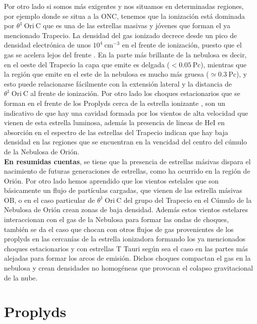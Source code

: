 Por otro lado si somos más exigentes y nos situamos en determinadas regiones, por ejemplo donde se situa a la ONC, tenemos que la ionización está dominada por  \(\theta^1\ \text{Ori}\ \text{C}\) que es una de las estrellas masivas y jóvenes que forman el ya mencionado Trapecio. La densidad del gas ionizado decrece desde un pico de densidad electrónica de unos  \(10^{4}~\text{cm}^{-3}\) en el frente de ionización, puesto que el gas se acelera lejos del frente \citep{Henney:2005a}. En la parte más brillante de la nebulosa es decir, en el oeste del Trapecio la capa que emite es delgada (\(< 0.05 ~\text{Pc}\)), mientras que la región que emite en el este de la nebulosa es mucho más gruesa (\(\simeq 0.3~\text{Pc}\)), y esto puede relacionarse fácilmente con la extensión lateral y la distancia de  \(\theta^1\ \text{Ori}\ \text{C}\) al frente de ionización. Por otro lado los choques estacionarios que se forman en el frente de los Proplyds cerca de la estrella ionizante \citep{Bally:2000a}, son un indicativo de que hay una cavidad formada por los vientos de alta velocidad que vienen de esta estrella luminosa, además  la presencia de lineas de HeI en absorción en el espectro de las estrellas del Trapecio \citep{ Odell:1993, Baldwin:1991} indican que hay baja densidad en las regiones que se encuentran en la vencidad del centro del cúmulo de la Nebulosa de Orión. \\

\textbf{En resumidas cuentas}, se tiene que la presencia de estrellas másivas dispara el nacimiento de futuras generaciones de estrellas, como ha ocurrido en la región de Orión. Por otro lado hemos aprendido que los vientos estelales que son básicamente un flujo de partículas cargadas, que vienen de las estrella másivas OB, o en el caso particular de \(\theta^1\ \text{Ori}\ \text{C}\) del grupo del Trapecio en el Cúmulo de la Nebulosa de Orión crean zonas de baja densidad. Además estos vientos estelares interaccionan con el gas de la Nebulosa para formar las ondas de choques, también se da el caso que chocan con otros flujos de gas provenientes de los proplyds en las cercanías de la estrella ionizadora formando los ya mencionados choques estacionarios y con estrellas T Tauri según sea el caso en las partes más alejadas para formar los arcos de emisión. Dichos choques compactan el gas en la nebulosa y crean densidades no homogéneas que provocan el colapso gravitacional de la nube.\\

\section{Proplyds}
\label{sec:proplyds}

